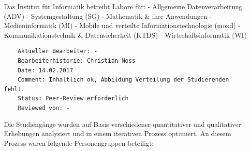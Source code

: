 Das Institut für Informatik betreibt Labore für: - Allgemeine
Datenverarbeitung (ADV) - Systemgestaltung (SG) - Mathematik \& ihre
Anwendungen - Medieninformatik (MI) - Mobile und verteilte
Informationstechnologie (moxd) - Kommunikationstechnik \&
Datensicherheit (KTDS) - Wirtschaftsinformatik (WI)

\begin{verbatim}
    Aktueller Bearbeiter: -
    Bearbeiterhistorie: Christian Noss
    Date: 14.02.2017
    Comment: Inhaltlich ok, Abbildung Verteilung der Studierenden fehlt.
    Status: Peer-Review erforderlich
    Reviewed von: -
\end{verbatim}

Die Studiengänge wurden auf Basis verschiedener quantitativer und
qualitativer Erhebungen analysiert und in einem iterativen Prozess
optimiert. An diesem Prozess waren folgende Personengruppen beteiligt:

